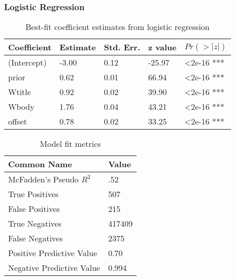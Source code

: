 \documentclass[10pt,letterpaper]{article}
\begin{document}
\subsubsection{Logistic Regression}

\vspace{-1em}

\renewcommand{\arraystretch}{1}
\renewcommand{\tabcolsep}{1mm}
\begin{table}[!ht]
  \begin{center}
    \caption{Best-fit coefficient estimates from logistic regression}
    \label{tab:coeffs}
    \vskip 0.12in
    \begin{tabular}{lllll}
      \hline
      Coefficient & 	Estimate &	Std. Err. &	z value &	$Pr(>|z|)$  \\
      \hline
      (Intercept) &	-3.00 &		0.12 &		-25.97 &	\textless2e-16 *** \\
      prior &		0.62 & 		0.01 &		66.94 & 	\textless2e-16 *** \\
      Wtitle &		0.92 &		0.02 &		39.90 &		\textless2e-16 *** \\
      Wbody &		1.76 &		0.04 &		43.21 &		\textless2e-16 *** \\
      offset &		0.78 &		0.02 &		33.25 &		\textless2e-16 *** \\
      \hline
    \end{tabular}
  \end{center}
\end{table}

\renewcommand{\arraystretch}{1}
\renewcommand{\tabcolsep}{3mm}
\begin{table}[!ht]
  \begin{center}
    \caption{Model fit metrics}
    \label{tab:fits}
    \vskip 0.12in
    \begin{tabular}{ll}
      \hline
      Common Name &  Value	\\
      \hline
      McFadden's Pseudo $R_{}^{2}$ &	.52 \\
      True Positives &			507 \\
      False Positives &			215 \\
      True Negatives &			\num{417409} \\
      False Negatives &			\num{2375} \\
      Positive Predictive Value &	0.70 \\
      Negative Predictive Value &	0.994 \\
      \hline
    \end{tabular}
  \end{center}
\end{table}
\end{document}
